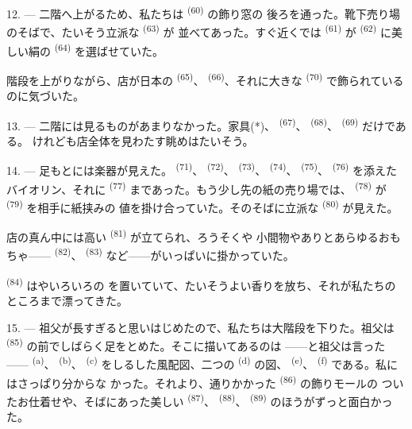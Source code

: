 12. --- 二階へ上がるため、私たちは \textsuperscript{(60)} の飾り窓の
後ろを通った。靴下売り場のそばで、たいそう立派な \textsuperscript{(63)} が
並べてあった。すぐ近くでは \textsuperscript{(61)} が
\textsuperscript{(62)} に美しい絹の \textsuperscript{(64)} を選ばせていた。

階段を上がりながら、店が日本の \textsuperscript{(65)}、
\textsuperscript{(66)}、それに大きな \textsuperscript{(70)} で飾られている
のに気づいた。

13. --- 二階には見るものがあまりなかった。家具(*)、 \textsuperscript{(67)}、
 \textsuperscript{(68)}、 \textsuperscript{(69)} だけである。
けれども店全体を見わたす眺めはたいそう。

14. --- 足もとには楽器が見えた。 \textsuperscript{(71)}、
 \textsuperscript{(72)}、 \textsuperscript{(73)}、
 \textsuperscript{(74)}、
\textsuperscript{(75)}、 \textsuperscript{(76)} を添えたバイオリン、それに
 \textsuperscript{(77)} まであった。もう少し先の紙の売り場では、
 \textsuperscript{(78)} が \textsuperscript{(79)} を相手に紙挟みの
値を掛け合っていた。そのそばに立派な \textsuperscript{(80)} が見えた。

店の真ん中には高い \textsuperscript{(81)} が立てられ、ろうそくや
小間物やありとあらゆるおもちゃ—— \textsuperscript{(82)}、
\textsuperscript{(83)} など——がいっぱいに掛かっていた。

 \textsuperscript{(84)} はやいろいろの
を置いていて、たいそうよい香りを放ち、それが私たちのところまで漂ってきた。

\VUsaut{3.4mm}
\VUsaut{2.8mm}

15. --- 祖父が長すぎると思いはじめたので、私たちは大階段を下りた。祖父は
 \textsuperscript{(85)} の前でしばらく足をとめた。そこに描いてあるのは
——と祖父は言った—— \textsuperscript{(a)}、
\textsuperscript{(b)}、 \textsuperscript{(c)} 
をしるした風配図、二つの \textsuperscript{(d)} の図、
\textsuperscript{(e)}、 \textsuperscript{(f)} である。私にはさっぱり分からな
かった。それより、通りかかった \textsuperscript{(86)} の飾りモールの
ついたお仕着せや、そばにあった美しい \textsuperscript{(87)}、
\textsuperscript{(88)}、 \textsuperscript{(89)} のほうがずっと面白かった。

